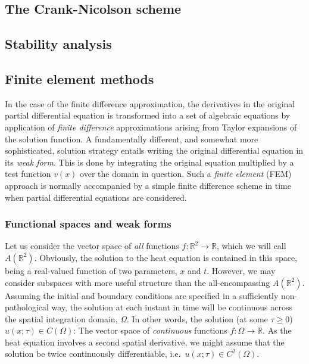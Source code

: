 \documentclass[a4paper, twocolumn]{article}
\begin{document}
\subsection{The Crank-Nicolson scheme}
\lipsum[3]

\subsection{Stability analysis \label{sect:finitestability}}
\lipsum[4]


\subsection{Finite element methods}
In the case of the finite difference approximation, the derivatives in the original partial differential equation is transformed into a set of algebraic equations by application of \textit{finite difference} approximations arising from Taylor expansions of the solution function. A fundamentally different, and somewhat more sophisticated, solution strategy entails writing the original differential equation in its \textit{weak form}. This is done by integrating the original equation multiplied by a test function $v(x)$ over the domain in question. Such a \textit{finite element} (FEM) approach is normally accompanied by a simple finite difference scheme in time when partial differential equations are considered. 

\subsubsection{Functional spaces and weak forms}
Let us consider the vector space of \textit{all} functions $f:\mathds{R}^2\rightarrow\mathds{R}$, which we will call $A(\mathds{R}^2)$. Obviously, the solution to the heat equation is contained in this space, being a real-valued function of two parameters, $x$ and $t$. However, we may consider subspaces with more useful structure than the all-encompassing $A(\mathds{R}^2)$. Assuming the initial and boundary conditions are specified in a sufficiently non-pathological way, the solution at each instant in time will be continuous across the spatial integration domain, $\Omega$. In other words, the solution (at some $\tau\ge0$) $u(x;\tau)\in C(\Omega)$: The vector space of \textit{continuous} functions $f:\Omega\rightarrow\mathds{R}$. As the heat equation involves a second spatial derivative, we might assume that the solution be twice continuously differentiable, i.e.\ $u(x;\tau)\in C^2(\Omega)$.
\end{document}

